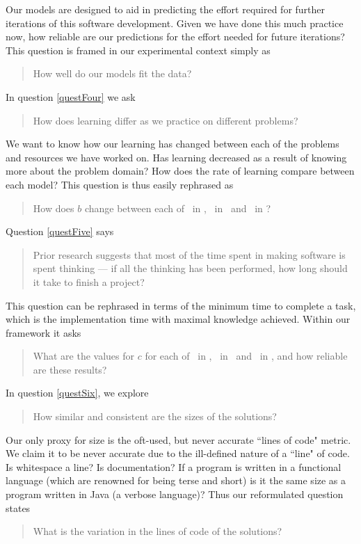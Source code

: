 Our models are designed to aid in predicting the effort required for further iterations of
this software development.
Given we have done this much practice now, how reliable are our predictions for
the effort needed for future iterations?
This question is framed in our experimental context simply as
\begin{quote}
  How well do our models fit the data?
\end{quote}\label{qq3}

In question \ref{questFour} we ask
\begin{quote}
  How does learning differ as we practice on different problems? 
\end{quote}

We want to know how our learning has changed between each of the problems and
resources we have worked on.
Has learning decreased as a result of knowing more about the problem domain?
How does the rate of learning compare between each model?
This question is thus easily rephrased as
\begin{quote}
   How does $b$ change between each of \PO\ in \LA, \PO\ in
   \LB\ and \PT\ in \LA?
\end{quote} \label{qq4}

Question \ref{questFive} says
\begin{quote}
  Prior research suggests that most of the time spent in making software is spent
  thinking --- if all the thinking has been performed, how long should it take to
  finish a project?
\end{quote}

This question can be rephrased in terms of the minimum time to complete a task,
     which is the implementation time with maximal knowledge achieved.
Within our framework it asks
\begin{quote}
  What are the values for $c$ for each of \PO\ in \LA, \PO\ in \LB\ and \PT\ in
  \LA, and how reliable are these results?
\end{quote} \label{qq5}

In question \ref{questSix}, we explore
\begin{quote}
  How similar and consistent are the sizes of the solutions?
\end{quote}

Our only proxy for size is the oft-used, but never accurate ``lines of code"
metric.
We claim it to be never accurate due to the ill-defined nature of a ``line" of
code.
Is whitespace a line?
Is documentation?
If a program is written in a functional language (which are renowned for being
terse and short) is it the same size as a program written in Java (a verbose
language)?
Thus our reformulated question states
\begin{quote}
  What is the variation in the lines of code of the solutions?
\end{quote} \label{qq6}

